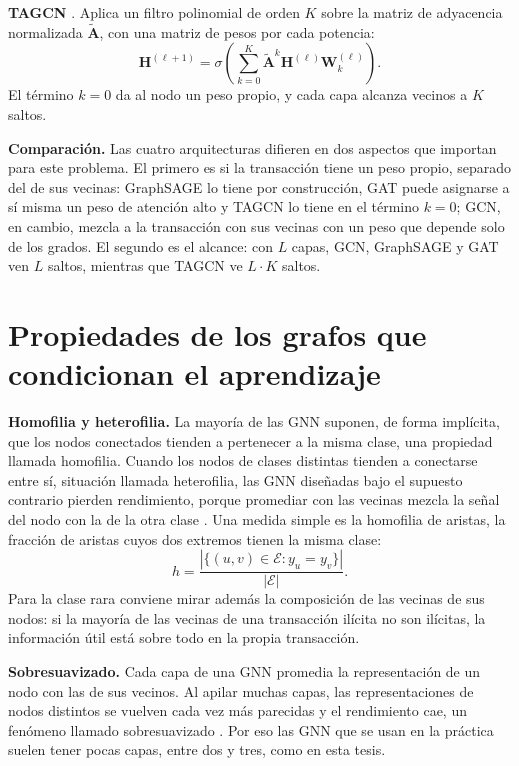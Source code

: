 \textbf{TAGCN} \cite{Du2017TAGCN}. Aplica un filtro polinomial de orden $K$ sobre la matriz de
adyacencia normalizada $\tilde{\mathbf{A}}$, con una matriz de pesos por cada potencia:
\begin{equation}
  \mathbf{H}^{(\ell+1)} = \sigma\!\left(\sum_{k=0}^{K} \tilde{\mathbf{A}}^{k} \mathbf{H}^{(\ell)}
  \mathbf{W}_k^{(\ell)}\right).
\end{equation}
El término $k = 0$ da al nodo un peso propio, y cada capa alcanza vecinos a $K$ saltos.

\textbf{Comparación.} Las cuatro arquitecturas difieren en dos aspectos que importan para este
problema. El primero es si la transacción tiene un peso propio, separado del de sus vecinas:
GraphSAGE lo tiene por construcción, GAT puede asignarse a sí misma un peso de atención alto y
TAGCN lo tiene en el término $k = 0$; GCN, en cambio, mezcla a la transacción con sus vecinas
con un peso que depende solo de los grados. El segundo es el alcance: con $L$ capas, GCN,
GraphSAGE y GAT ven $L$ saltos, mientras que TAGCN ve $L \cdot K$ saltos.

\section{Propiedades de los grafos que condicionan el aprendizaje}\label{sec:propiedades}

\textbf{Homofilia y heterofilia.} La mayoría de las GNN suponen, de forma implícita, que los
nodos conectados tienden a pertenecer a la misma clase, una propiedad llamada homofilia. Cuando
los nodos de clases distintas tienden a conectarse entre sí, situación llamada heterofilia, las
GNN diseñadas bajo el supuesto contrario pierden rendimiento, porque promediar con las vecinas
mezcla la señal del nodo con la de la otra clase \cite{Zheng2026Heterophily}. Una medida simple
es la homofilia de aristas, la fracción de aristas cuyos dos extremos tienen la misma clase:
\begin{equation}
  h = \frac{|\{(u, v) \in \mathcal{E} : y_u = y_v\}|}{|\mathcal{E}|}.
\end{equation}
Para la clase rara conviene mirar además la composición de las vecinas de sus nodos: si la
mayoría de las vecinas de una transacción ilícita no son ilícitas, la información útil está
sobre todo en la propia transacción.

\textbf{Sobresuavizado.} Cada capa de una GNN promedia la representación de un nodo con las de
sus vecinos. Al apilar muchas capas, las representaciones de nodos distintos se vuelven cada
vez más parecidas y el rendimiento cae, un fenómeno llamado sobresuavizado
\cite{Residual2025Oversmoothing}. Por eso las GNN que se usan en la práctica suelen tener pocas
capas, entre dos y tres, como en esta tesis.

